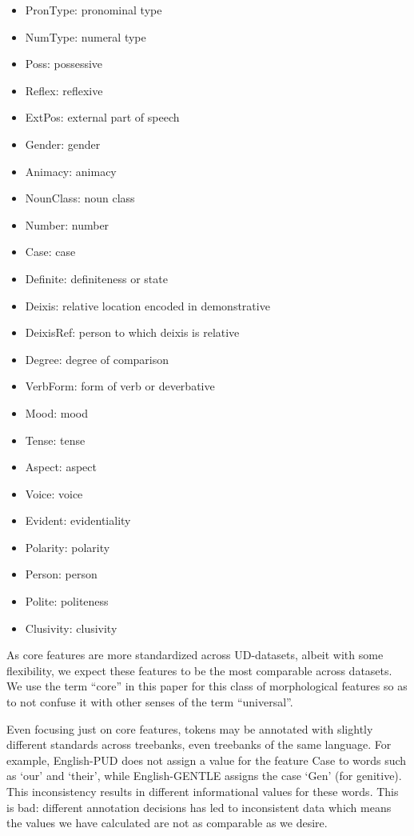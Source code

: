 \documentclass[USenglish]{article}
\begin{document}
\begin{itemize}
    \item PronType: pronominal type 
    \item NumType: numeral type
    \item Poss: possessive
    \item Reflex: reflexive
    \item ExtPos: external part of speech
    \item Gender: gender
    \item Animacy: animacy
    \item NounClass: noun class
    \item Number: number
    \item Case: case
    \item Definite: definiteness or state
    \item Deixis: relative location encoded in demonstrative
    \item DeixisRef: person to which deixis is relative
    \item Degree: degree of comparison
    \item VerbForm: form of verb or deverbative
    \item Mood: mood 
    \item Tense: tense
    \item Aspect: aspect 
    \item Voice: voice
    \item Evident: evidentiality
    \item Polarity: polarity
    \item Person: person
    \item Polite: politeness
    \item Clusivity: clusivity
\end{itemize}

As core features are more standardized across UD-datasets, albeit with some flexibility, we expect these features to be the most comparable across datasets.
We use the term ``core'' in this paper for this class of morphological features so as to not confuse it with other senses of the term ``universal''.

Even focusing just on core features, tokens may be annotated with slightly different standards across treebanks, even treebanks of the same language.
For example, English-PUD does not assign a value for the feature Case to words such as `our' and `their', while English-GENTLE assigns the case `Gen' (for genitive). 
This inconsistency results in different informational values for these words. 
This is bad: different annotation decisions has led to inconsistent data which means the values we have calculated are not as comparable as we desire.
\end{document}
